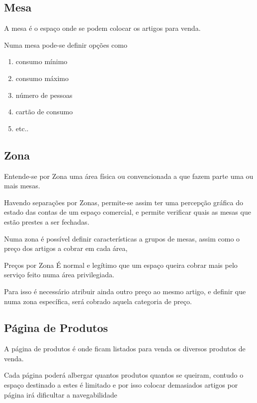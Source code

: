 \documentclass[a4paper,11pt,openany]{memoir}
\begin{document}
\subsection{Mesa}
A mesa é o espaço onde se podem colocar os artigos para venda.

Numa mesa pode-se definir opções como
\begin{enumerate}
\item consumo mínimo
\item consumo máximo
\item número de pessoas
\item cartão de consumo
\item etc..
\end{enumerate}


\subsection{Zona}

Entende-se por Zona uma área física ou convencionada a que fazem parte uma ou mais mesas. 

Havendo separações por Zonas, permite-se assim ter uma percepção gráfica do estado das 
contas de um espaço comercial, e permite verificar quais as mesas que estão prestes a ser
fechadas.

Numa zona é possível definir características a grupos de mesas, assim como o preço dos artigos a cobrar em cada área,

\begin{bclogo}[couleur=blue!10,arrondi=0.1,logo=\bclampe,ombre=true]{Preços por Zona}
É normal e legítimo que um espaço queira cobrar mais pelo serviço feito numa área privilegiada.

Para isso é necessário atribuir ainda outro preço ao mesmo artigo, e definir que numa zona específica,
será cobrado aquela categoria de preço. 
\end{bclogo}
 

\subsection{Página de Produtos}

A página de produtos é onde ficam listados para venda os diversos produtos de venda.

Cada página poderá albergar quantos produtos quantos se queiram, contudo o espaço destinado a estes é 
limitado e por isso colocar demasiados artigos por página irá dificultar a navegabilidade
\end{document}
